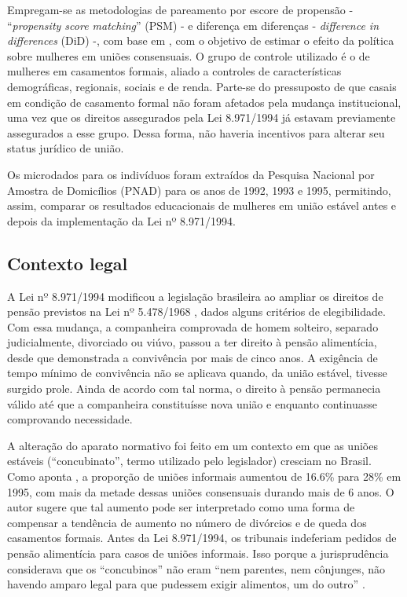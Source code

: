 \documentclass[12pt,oneside,a4paper]{article}
\begin{document}
Empregam-se as metodologias de pareamento por escore de propensão - ``\textit{propensity score matching}'' (PSM) - e diferença em diferenças - \textit{difference in differences} (DiD) -, com base em , com o objetivo de estimar o efeito da política sobre mulheres em uniões consensuais. O grupo de controle utilizado é o de mulheres em casamentos formais, aliado a controles de características demográficas, regionais, sociais e de renda. Parte-se do pressuposto de que casais em condição de casamento formal não foram afetados pela mudança institucional, uma vez que os direitos assegurados pela Lei 8.971/1994 já estavam previamente assegurados a esse grupo. Dessa forma, não haveria incentivos para alterar seu status jurídico de união.

Os microdados para os indivíduos foram extraídos da Pesquisa Nacional por Amostra de Domicílios (PNAD) para os anos de 1992, 1993 e 1995, permitindo, assim, comparar os resultados educacionais de mulheres em união estável antes e depois da implementação da Lei nº 8.971/1994.

\subsection{Contexto legal}

A Lei nº 8.971/1994 modificou a legislação brasileira ao ampliar os direitos de pensão previstos na Lei nº 5.478/1968 \cite{brasil_lei5478_1968}, dados alguns critérios de elegibilidade. Com essa mudança, a companheira comprovada de homem solteiro, separado judicialmente, divorciado ou viúvo, passou a ter direito à pensão alimentícia, desde que demonstrada a convivência por mais de cinco anos. A exigência de tempo mínimo de convivência não se aplicava quando, da união estável, tivesse surgido prole. Ainda de acordo com tal norma, o direito à pensão permanecia válido até que a companheira constituísse nova união e enquanto continuasse comprovando necessidade. 

A alteração do aparato normativo foi feito em um contexto em que as uniões estáveis (``concubinato'', termo utilizado pelo legislador) cresciam no Brasil. Como aponta , a proporção de uniões informais aumentou de 16.6\% para 28\% em 1995, com mais da metade dessas uniões consensuais durando mais de 6 anos. O autor sugere que tal aumento pode ser interpretado como uma forma de compensar a tendência de aumento no número de divórcios e de queda dos casamentos formais. Antes da Lei 8.971/1994, os tribunais indeferiam pedidos de pensão alimentícia para casos de uniões informais. Isso porque a jurisprudência considerava que os ``concubinos'' não eram ``nem parentes, nem cônjunges, não havendo amparo legal para que pudessem exigir alimentos, um do outro'' \cite{wald1995lei}.
\end{document}
